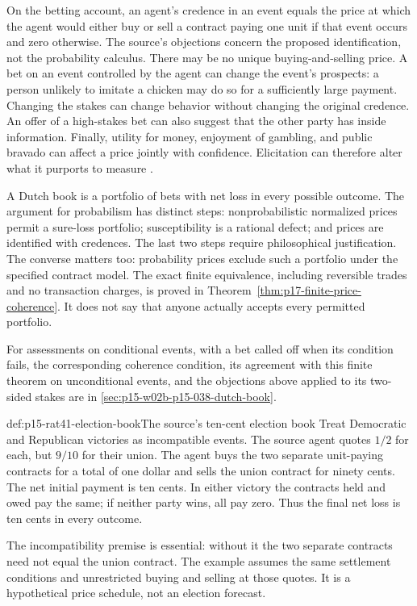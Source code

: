 On the betting account, an agent's credence in an event equals the price
at which the agent would either buy or sell a contract paying one unit
if that event occurs and zero otherwise. The source's objections concern
the proposed identification, not the probability calculus. There may be
no unique buying-and-selling price. A bet on an event controlled by the
agent can change the event's prospects: a person unlikely to imitate a
chicken may do so for a sufficiently large payment. Changing the stakes
can change behavior without changing the original credence. An offer of
a high-stakes bet can also suggest that the other party has inside
information. Finally, utility for money, enjoyment of gambling, and
public bravado can affect a price jointly with confidence. Elicitation
can therefore alter what it purports to measure
\parencite[p.~240]{HajekStaffel2021Dynamics}.

A Dutch book is a portfolio of bets with net loss in every possible
outcome. The argument for probabilism has distinct steps: nonprobabilistic
normalized prices permit a sure-loss portfolio; susceptibility is a
rational defect; and prices are identified with credences. The last two
steps require philosophical justification. The converse matters too:
probability prices exclude such a portfolio under the specified contract
model. The exact finite equivalence, including reversible trades and no
transaction charges, is proved in
Theorem~\ref{thm:p17-finite-price-coherence}. It does not say that anyone
actually accepts every permitted portfolio.

For assessments on conditional events, with a bet called off when its
condition fails, the corresponding coherence condition, its agreement with
this finite theorem on unconditional events, and the objections above
applied to its two-sided stakes are in \cref{sec:p15-w02b-p15-038-dutch-book}.

\begin{hbexample}{def:p15-rat41-election-book}{The source's ten-cent election book}
Treat Democratic and Republican victories as incompatible events. The
source agent quotes \(1/2\) for each, but \(9/10\) for their union.
The agent buys the two separate unit-paying contracts for a total of
one dollar and sells the union contract for ninety cents. The net
initial payment is ten cents. In either victory the contracts held and
owed pay the same; if neither party wins, all pay zero. Thus the final
net loss is ten cents in every outcome.

The incompatibility premise is essential: without it the two separate
contracts need not equal the union contract. The example assumes the
same settlement conditions and unrestricted buying and selling at those
quotes. It is a hypothetical price schedule, not an election forecast.
\end{hbexample}

